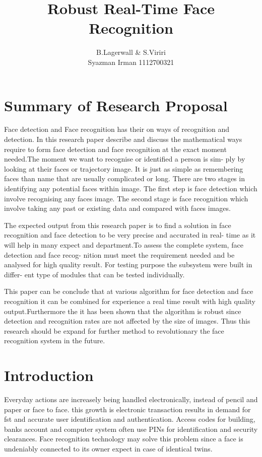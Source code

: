\documentclass[a4paper,12pt]{article}
\title{Robust Real-Time Face Recognition}
\author{B.Lagerwall & S.Viriri \\ Syazman Irman 1112700321}
\begin{document}
\maketitle
\tableofcontents
\newpage
\section{Summary of Research Proposal}
\hspace{1cm}Face detection and Face recognition has their on ways of recognition and detection. In this research paper describe and discuss the mathematical ways require to form face detection and face recognition at the exact moment needed.The moment we want to recognise or identified a person is sim- ply by looking at their faces or trajectory image. It is just as simple as remembering faces than name that are usually complicated or long. There are two stages in identifying any potential faces within image. The first step is face detection which involve recognising any faces image. The second stage is face recognition which involve taking any past or existing data and compared with faces images.

\hspace{1cm}The expected output from this research paper is to find a solution in face recognition and face detection to be very precise and accurated in real- time as it will help in many expect and  department.To assess the complete system, face detection and face recog- nition must meet the requirement needed and be analysed for high quality result. For testing purpose the subsystem were built in differ- ent type of modules that can be tested individually.

\hspace{1cm}This paper can be conclude that at various algorithm for face detection and face recognition it can be combined for experience a real time result with high quality output.Furthermore the it has been shown that the algorithm is robust since detection and recognition rates are not affected by the size of images. Thus this research should be expand for further method to revolutionary the face recognition system in the future.


\section{Introduction}
\hspace{1cm}Everyday actions are increasely being handled electronically, instead of pencil and paper or face to face. this growth is electronic transaction results in demand for fst and accurate user identification and authentication. Access codes for building, banks account and computer system often use PINs for identification and security clearances. Face recognition technology may solve this problem since a face is undeniably connected to its owner expect in case of identical twins.
\end{document}
